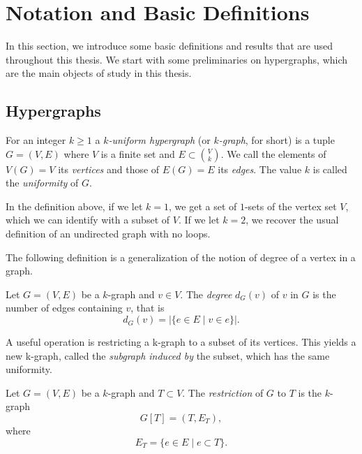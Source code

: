 \section{Notation and Basic Definitions}\label{sec:preliminaries}
In this section, we introduce some basic definitions and results that are used throughout this thesis.
We start with some preliminaries on hypergraphs, which are the main objects of study in this thesis.

\subsection{Hypergraphs}\label{subsec:hypergraphs}

\begin{definition}

    For an integer $k \geq 1$ a \emph{$k$-uniform hypergraph} (or \emph{$k$-graph}, for short)
    is a tuple $G = (V, E)$ where $V$ is a finite set
    and $E \subset \binom{V}{k}$.
    We call the elements of $V(G) = V$ its \emph{vertices}
    and those of $E(G) = E$ its \emph{edges}.
    The value $k$ is called the \emph{uniformity} of $G$.
\end{definition}

\begin{remark}
    In the definition above, if we let $k=1$, we get a set of $1$-sets of the vertex set $V$,
    which we can identify with a subset of $V$.
    If we let $k=2$, we recover the usual definition of an undirected graph with no loops.
\end{remark}

The following definition is a generalization of the notion of degree
of a vertex in a graph.

\begin{definition}
    Let $G = (V, E)$ be a $k$-graph and $v \in V$.
    The \emph{degree} $d_G(v)$ of $v$ in $G$
    is the number of edges containing $v$, that is
    \[
        d_G(v) = |\{e \in E \mid v \in e\}|.
    \]
\end{definition}

A useful operation is restricting a k-graph to a subset of its vertices.
This yields a new k-graph, called the \emph{subgraph induced by} the subset, which has the same uniformity.

\begin{definition}

    \label{def:restriction}
    Let $G = (V, E)$ be a $k$-graph and $T \subset V$.
    The \emph{restriction} of $G$ to $T$ is the $k$-graph
    \[
        G[T] = (T, E_T),
    \]
    where
    \[E_T = \{e \in E \mid e \subset T\}.\]
\end{definition}

